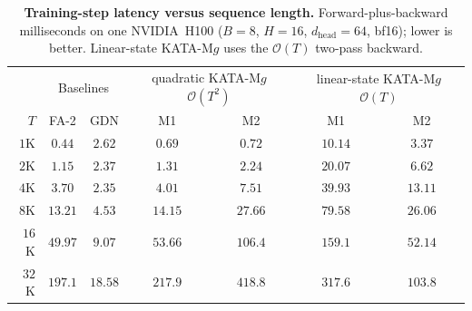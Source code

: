 \documentclass{article}
\newcommand{\1}{\bm{1}}
\def\gO{{\mathcal{O}}}
\newcommand{\seql}{T}
\theoremstyle{definition}
\begin{document}
\begin{table}[htbp]
    \centering\footnotesize
    \caption{\textbf{Training-step latency versus sequence length.}
    Forward-plus-backward milliseconds on one NVIDIA~H100
    ($B{=}8$, $H{=}16$, $d_\text{head}{=}64$, bf16); lower is better.
    Linear-state KATA-M$g$ uses the $\gO(\seql)$ two-pass backward.}
    \label{tab:tsweep-bwd}
    \begin{tabular}{r|cc|cc|cc}
    \toprule
    & \multicolumn{2}{c|}{Baselines} & \multicolumn{2}{c|}{quadratic KATA-M$g$ $\gO(\seql^2)$} & \multicolumn{2}{c}{linear-state KATA-M$g$ $\gO(\seql)$} \\
    $\seql$ & FA-2 & GDN & M1 & M2 & M1 & M2 \\
    \midrule
    $1$K  & $0.44$  & $2.62$  & $0.69$  & $0.72$  & $10.14$ & $3.37$   \\
    $2$K  & $1.15$  & $2.37$  & $1.31$  & $2.24$  & $20.07$ & $6.62$   \\
    $4$K  & $3.70$  & $2.35$  & $4.01$  & $7.51$  & $39.93$ & $13.11$  \\
    $8$K  & $13.21$ & $4.53$  & $14.15$ & $27.66$ & $79.58$ & $26.06$  \\
    $16$K & $49.97$ & $9.07$  & $53.66$ & $106.4$ & $159.1$ & $52.14$  \\
    $32$K & $197.1$ & $18.58$ & $217.9$ & $418.8$ & $317.6$ & $103.8$  \\
    \bottomrule
    \end{tabular}
\end{table}
\end{document}
